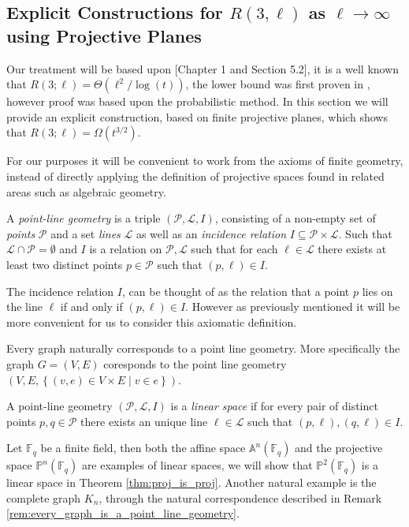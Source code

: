\subsection{Explicit Constructions for $R(3, \ell)$ as $\ell \to \infty$ using Projective Planes}
Our treatment will be based upon \cite{fg_and_rt}[Chapter 1 and Section 5.2], it is a well known that $R(3; \ell) = \Theta(\ell^2 / \log(t))$, the lower bound was first proven in \cite{R3t}, however proof was based upon the probabilistic method. In this section we will provide an explicit construction, based on finite projective planes, which shows that $R(3; \ell) = \Omega(t^{3 / 2})$.

For our purposes it will be convenient to work from the axioms of finite geometry, instead of directly applying the definition of projective spaces found in related areas such as algebraic geometry.

\begin{definition}
	A \textit{point-line geometry} is a triple $(\mathcal{P}, \mathcal{L}, I)$, consisting of a non-empty set of \textit{points} $\mathcal{P}$ and a set \textit{lines} $\mathcal{L}$ as well as an \textit{incidence relation} $I \subseteq \mathcal{P} \times \mathcal{L}$. Such that $\mathcal{L} \cap \mathcal{P} = \emptyset$ and $I$ is a relation on $\mathcal{P}, \mathcal{L}$ such that for each $\ell \in \mathcal{L}$ there exists at least two distinct points $p \in \mathcal{P}$ such that $(p, \ell) \in I$.
\end{definition}
The incidence relation $I$, can be thought of as the relation that a point $p$ lies on the line $\ell$ if and only if $(p, \ell) \in I$. However as previously mentioned it will be more convenient for us to consider this axiomatic definition.
\begin{remark}\label{rem:every_graph_is_a_point_line_geometry}
	Every graph naturally corresponds to a point line geometry. More specifically the graph $G = (V, E)$ coresponds to the point line geometry $(V, E, \left\{(v, e) \in V \times E \middle| v \in e\right\})$.
\end{remark}

\begin{definition}
	A point-line geometry $(\mathcal{P}, \mathcal{L}, I)$ is a \textit{linear space} if for every pair of distinct points $p, q \in \mathcal{P}$ there exists an unique line $\ell \in \mathcal{L}$ such that $(p, \ell), (q, \ell) \in I$.
\end{definition}
Let $\mathbb{F}_q$ be a finite field, then both the affine space $\mathbb{A}^n(\mathbb{F}_q)$ and the projective space $\mathbb{P}^n(\mathbb{F}_q)$ are examples of linear spaces, we will show that $\mathbb{P}^2(\mathbb{F}_q)$ is a linear space in Theorem \ref{thm:proj_is_proj}. Another natural example is the complete graph $K_n$, through the natural correspondence described in Remark \ref{rem:every_graph_is_a_point_line_geometry}.

